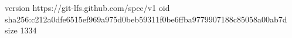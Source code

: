 version https://git-lfs.github.com/spec/v1
oid sha256:c212a0dfe6515ef969a975d0beb59311f0be6ffba9779907188c85058a00ab7d
size 1334
